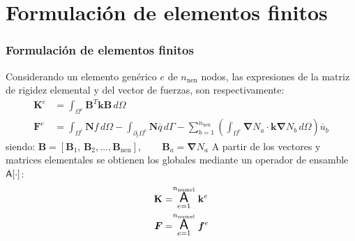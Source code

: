 \documentclass[handout]{beamer}
\begin{document}
\section{Formulación de elementos finitos}
\begin{frame}
\frametitle{Formulación de elementos finitos}

Considerando un elemento genérico $e$ de $n_{\textrm{nen}}$ nodos, las
expresiones de la matriz de rigidez elemental y del vector de fuerzas, son
respectivamente:
\begin{align*}
\mathbf{K}^e&=\int_{\Omega^e} \mathbf{B}^T \mathbf{k} \mathbf{B} \, d \Omega \\
\bm{F}^e&=\int_{\Omega^e} \bm{N} f \, d\Omega 
-\int_{\partial_t \Omega^e} \bm{N} \overline{q} \, d\Gamma-
\sum_{b=1}^{n_{\textrm{nen}}} \left(
\int_{\Omega^e} \bm{\nabla} N_a \cdot \bm{k} \bm{\nabla} N_b \, d \Omega \right)
\overline{u}_b
\end{align*}
siendo:
$
\mathbf{B}=\left[
\bm{B}_1,\,\bm{B}_2,\ldots,\bm{B}_{\textrm{nen}}
\right], \qquad
\bm{B}_a=\bm{\nabla}N_a
$
A partir de los vectores y matrices elementales se obtienen los
globales mediante un operador de ensamble ${\Large \bf{\sf A}[\cdot]}$:
\begin{align}
\mathbf{K} &=
\stackrel{{n_{\rm numel}}}{\underset{e=1}{\mbox{\Large{\bf {\sf A}}}}}
\mathbf{k}^e \label{assemK} \\
    \bm{F} &=
\stackrel{{n_{\rm numel}}}{\underset{e=1}{\mbox{\Large{\bf {\sf A}}}}}
\bm{f}^e \label{assemF}
\end{align}
\end{frame}
\end{document}
